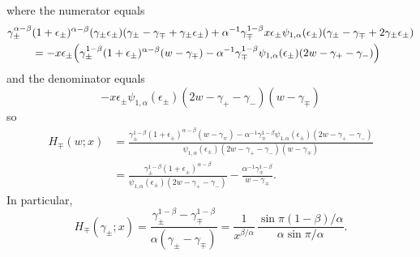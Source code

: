 \documentclass[12pt,a4paper]{article}
\begin{document}
where the numerator equals
\begin{align*}
\gamma_\pm^{\alpha-\beta}&(1+\epsilon_\pm)^{\alpha-\beta}
(\gamma_\pm\epsilon_\pm)
(\gamma_\pm-\gamma_\mp+\gamma_\pm\epsilon_\pm)
+\alpha^{-1}\gamma_\mp^{1-\beta}x\epsilon_\pm\psi_{1,\alpha}(\epsilon_\pm)
(\gamma_\pm-\gamma_\mp+2\gamma_\pm\epsilon_\pm)\\
&=-x\epsilon_\pm\Bigl(\gamma_\pm^{1-\beta}(1+\epsilon_\pm)^{\alpha-\beta}
(w-\gamma_\mp)
-\alpha^{-1}\gamma_\mp^{1-\beta}\psi_{1,\alpha}(\epsilon_\pm)
(2w-\gamma_+-\gamma_-)\Bigr)
\end{align*}
and the denominator equals
\[
-x\epsilon_\pm\psi_{1,\alpha}(\epsilon_\pm)
(2w-\gamma_+-\gamma_-)(w-\gamma_\mp)
\]
so
\begin{align*}
H_\mp(w;x)&=\frac{\gamma_\pm^{1-\beta}(1+\epsilon_\pm)^{\alpha-\beta} 
(w-\gamma_\mp)-\alpha^{-1}\gamma_\mp^{1-\beta}\psi_{1,\alpha}(\epsilon_\pm)
(2w-\gamma_+-\gamma_-)}%
{\psi_{1,\alpha}(\epsilon_\pm)(2w-\gamma_+-\gamma_-)(w-\gamma_\mp)}\\
&=\frac{\gamma_\pm^{1-\beta}(1+\epsilon_\pm)^{\alpha-\beta}}%
{\psi_{1,\alpha}(\epsilon_\pm)(2w-\gamma_+-\gamma_-)}
-\frac{\alpha^{-1}\gamma_\mp^{1-\beta}}{w-\gamma_\mp}.
\end{align*}
In particular,
\[
H_\mp(\gamma_\pm;x)=\frac{\gamma_\pm^{1-\beta}-\gamma_\mp^{1-\beta}}%
{\alpha(\gamma_\pm-\gamma_\mp)}=\frac{1}{x^{\beta/\alpha}}\,
\frac{\sin\pi(1-\beta)/\alpha}{\alpha\sin\pi/\alpha}.
\]




\printbibliography
\end{document}
